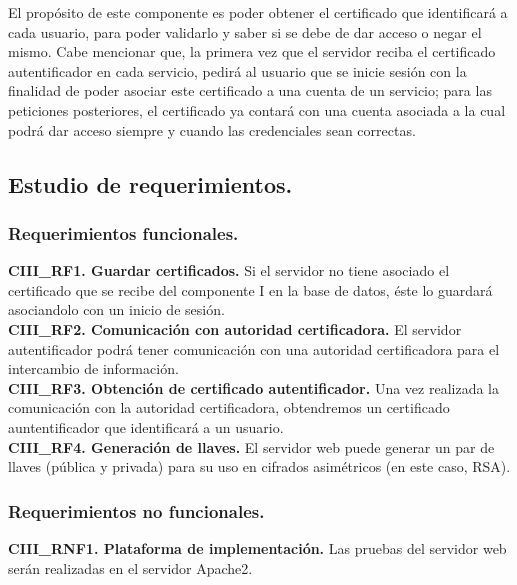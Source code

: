 \documentclass[12pt, a4paper, titlepage]{report}
\begin{document}
            El propósito de este componente es poder obtener el certificado que identificará a cada usuario, para poder validarlo y saber si se debe de dar acceso o negar el mismo. Cabe mencionar que, la primera vez que el servidor reciba el certificado autentificador en cada servicio, pedirá al usuario que se inicie sesión con la finalidad de poder asociar este certificado a una cuenta de un servicio; para las peticiones posteriores, el certificado ya contará con una cuenta asociada a la cual podrá dar acceso siempre y cuando las credenciales sean correctas.\\
            
	        \subsection{Estudio de requerimientos.}
	            \subsubsection{Requerimientos funcionales.}
	            \textbf{CIII\_RF1. Guardar certificados.} Si el servidor no tiene asociado el certificado que se recibe del componente I en la base de datos, éste lo guardará asociandolo con un inicio de sesión.\\
	            
	            \textbf{CIII\_RF2. Comunicación con autoridad certificadora.} El servidor autentificador podrá tener comunicación con una autoridad certificadora para el intercambio de información.\\
	                
	            \textbf{CIII\_RF3. Obtención de certificado autentificador.} Una vez realizada la comunicación con la autoridad certificadora, obtendremos un certificado auntentificador que identificará a un usuario.\\
	            
	            
	            \textbf{CIII\_RF4. Generación de llaves.} El servidor web puede generar un par de llaves (pública y privada) para su uso en cifrados asimétricos (en este caso, RSA).\\
	       
	            \subsubsection{Requerimientos no funcionales.}
	                \textbf{CIII\_RNF1. Plataforma de implementación.} Las pruebas del servidor web serán realizadas en el servidor Apache2.\\
\end{document}
